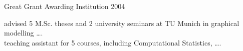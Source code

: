 
\begin{cvhonors}

  \cvhonor
    {Great Grant}
    {Awarding Institution}
    {}
    {2004}

\end{cvhonors}

\vspace{0.2em}
\begin{cvparagraph}
 advised 5 M.Sc. theses and 2 university seminars at TU Munich in graphical modelling \dots.\\[0.3em]
 teaching assistant for 5 courses, including Computational Statistics, \dots.
\end{cvparagraph}
